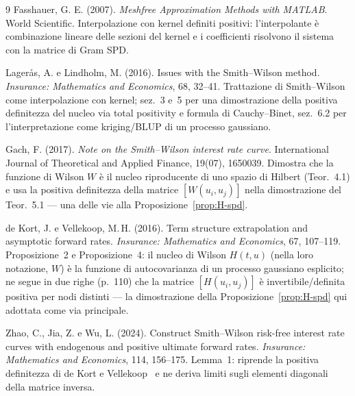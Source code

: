 \documentclass[11pt,a4paper]{article}
\theoremstyle{plain}
\theoremstyle{definition}
\theoremstyle{remark}
\begin{document}
\begin{thebibliography}{9}
Fasshauer, G. E. (2007).
\textit{Meshfree Approximation Methods with MATLAB}. World Scientific.
Interpolazione con kernel definiti positivi: l'interpolante \`e combinazione lineare delle
sezioni del kernel e i coefficienti risolvono il sistema con la matrice di Gram SPD.

Lager\aa s, A. e Lindholm, M. (2016).
Issues with the Smith--Wilson method.
\textit{Insurance: Mathematics and Economics}, 68, 32--41.
Trattazione di Smith--Wilson come interpolazione con kernel; sez.~3 e~5 per una dimostrazione
della positiva definitezza del nucleo via total positivity e formula di Cauchy--Binet,
sez.~6.2 per l'interpretazione come kriging/BLUP di un processo gaussiano.

Gach, F. (2017).
\textit{Note on the Smith--Wilson interest rate curve}.
International Journal of Theoretical and Applied Finance, 19(07), 1650039.
Dimostra che la funzione di Wilson $W$ \`e il nucleo riproducente di uno spazio di Hilbert
(Teor.~4.1) e usa la positiva definitezza della matrice $[W(u_i,u_j)]$ nella dimostrazione
del Teor.~5.1 --- una delle vie alla Proposizione~\ref{prop:H-spd}.

de Kort, J. e Vellekoop, M.\,H. (2016).
Term structure extrapolation and asymptotic forward rates.
\textit{Insurance: Mathematics and Economics}, 67, 107--119.
Proposizione~2 e Proposizione~4: il nucleo di Wilson $H(t,u)$ (nella loro notazione, $W$) \`e
la funzione di autocovarianza di un processo gaussiano esplicito; ne segue in due righe
(p.~110) che la matrice $[H(u_i,u_j)]$ \`e invertibile/definita positiva per nodi distinti ---
la dimostrazione della Proposizione~\ref{prop:H-spd} qui adottata come via principale.

Zhao, C., Jia, Z. e Wu, L. (2024).
Construct Smith--Wilson risk-free interest rate curves with endogenous and positive
ultimate forward rates.
\textit{Insurance: Mathematics and Economics}, 114, 156--175.
Lemma~1: riprende la positiva definitezza di de Kort e Vellekoop~\cite{dekort2016} e ne
deriva limiti sugli elementi diagonali della matrice inversa.

\end{thebibliography}
\end{document}
